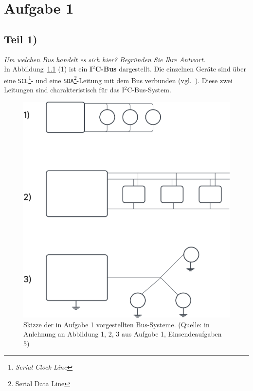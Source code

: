 \chapter{Aufgabe 1}

\section{Teil 1)}

\textit{Um welchen Bus handelt es sich hier? Begründen Sie Ihre Antwort.}\\


\noindent
In Abbildung~\ref{fig:bus} (1) ist ein \textbf{I$^2$C-Bus} dargestellt.
Die einzelnen Geräte sind über eine \texttt{SCL}\footnote{\textit{Serial Clock Line}}- und eine \texttt{SDA}\footnote{Serial Data Line}-Leitung mit dem Bus verbunden (vgl.~\cite[168]{ES4}). Diese zwei Leitungen sind charakteristisch für das I$^2$C-Bus-System.


\begin{figure}
    \centering
    \includegraphics[scale=0.3]{aufgabe 1/img/bus.svg}
    \caption{Skizze der in Aufgabe 1 vorgestellten Bus-Systeme. (Quelle: in Anlehnung an Abbildung 1, 2, 3 aus Aufgabe 1, Einsendeaufgaben 5)}
    \label{fig:bus}
\end{figure}


